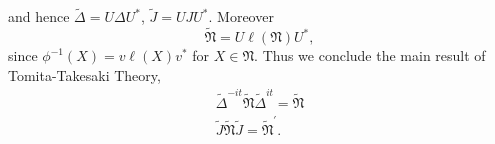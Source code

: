 and hence $\tilde{\Delta}=U\Delta U^\ast$, $\tilde{J}=UJU^\ast$.
Moreover  
$$
\tilde{\mathfrak{N}}=U\ell(\mathfrak{N})U^\ast,
$$
since $\phi^{-1}(X)=v\ell (X) v^\ast$ for $X\in \mathfrak{N}$.
Thus we conclude the main result of Tomita-Takesaki Theory,
\begin{equation}
\begin{split}
\tilde{\Delta}^{-it}\tilde{\mathfrak{N}}\tilde{\Delta}^{it}=\tilde{\mathfrak{N}}\\
\tilde{J}\tilde{\mathfrak{N}}\tilde{J}=\tilde{\mathfrak{N}}^\prime.
\end{split}
\end{equation}


